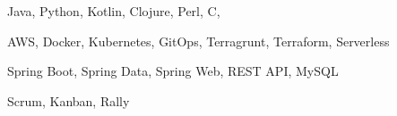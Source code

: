 
\begin{cvskills}

    {Java, Python, Kotlin, Clojure, Perl, C, \CC{}} %

    {AWS, Docker, Kubernetes, GitOps, Terragrunt, Terraform, Serverless} %

    {Spring Boot, Spring Data, Spring Web, REST API, MySQL} %

    {Scrum, Kanban, Rally} %

\end{cvskills}
